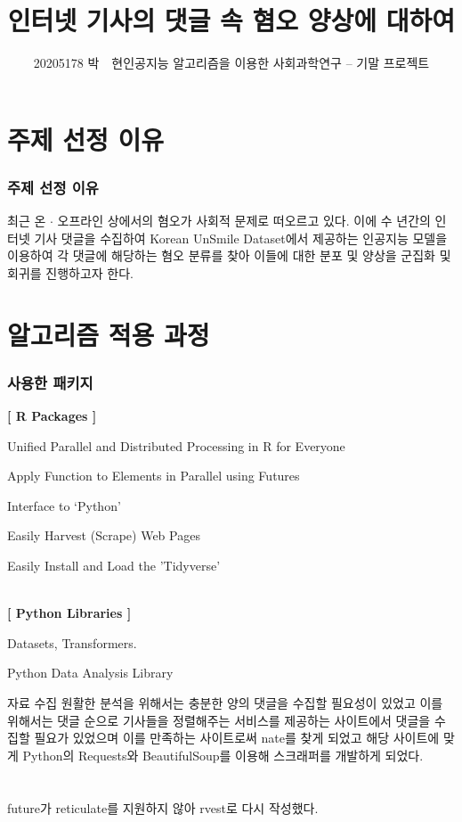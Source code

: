\documentclass[mathserif, aspectratio=169]{beamer}
\title{인터넷 기사의 댓글 속 혐오 양상에 대하여}
\author{20205178 박~~현\hfill 인공지능 알고리즘을 이용한 사회과학연구 -- 기말 프로젝트}
\institute{}
\date{}
\begin{document}
\frame{\titlepage}

\section{주제 선정 이유}
\begin{frame}
    \frametitle{주제 선정 이유}
    \justifying
    최근 온 $\cdot$ 오프라인 상에서의 혐오가 사회적 문제로 떠오르고 있다.
    이에 수 년간의 인터넷 기사 댓글을 수집하여 Korean UnSmile Dataset에서 제공하는 인공지능 모델을
    이용하여 각 댓글에 해당하는 혐오 분류를 찾아 이들에 대한 분포 및 양상을 군집화 및 회귀를 진행하고자 한다.
\end{frame}
\section{알고리즘 적용 과정}
\begin{frame}
    \frametitle{사용한 패키지}
    \textbf{[ R Packages ]}
    \begin{description}[labelwidth=3cm]
        \item [future:] Unified Parallel and Distributed Processing in R for Everyone
        \item [future.apply:] Apply Function to Elements in Parallel using Futures
        \item [reticulate:]  Interface to `Python'
        \item [rvest:] Easily Harvest (Scrape) Web Pages
        \item [tidyverse:] Easily Install and Load the 'Tidyverse'
    \end{description}
    ~\\
    \textbf{[ Python Libraries ]}
    \begin{description}[labelwidth=3cm]
        \item [Hugging Face:] Datasets, Transformers.
        \item [Pandas:] Python Data Analysis Library
    \end{description}
\end{frame}
\begin{frame}{자료 수집}
    \justifying
    원활한 분석을 위해서는 충분한 양의 댓글을 수집할 필요성이 있었고
    이를 위해서는 댓글 순으로 기사들을 정렬해주는 서비스를 제공하는 
    사이트에서 댓글을 수집할 필요가 있었으며 이를 만족하는 사이트로써
    nate를 찾게 되었고 해당 사이트에 맞게 Python의 Requests와 BeautifulSoup를 이용해
    스크래퍼를 개발하게 되었다.\\~\\~\\
    \hfill{} future가 reticulate를 지원하지 않아 rvest로 다시 작성했다.
\end{frame}
\end{document}
